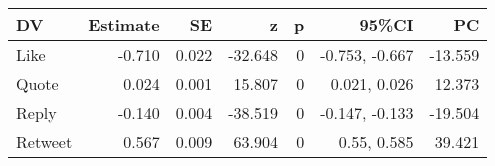 
\begin{tabular}{lrrrrrr}
\toprule
DV & Estimate & SE & z & p & 95\%CI & PC\\
\midrule
Like & -0.710 & 0.022 & -32.648 & 0 & -0.753, -0.667 & -13.559\\
Quote & 0.024 & 0.001 & 15.807 & 0 & 0.021, 0.026 & 12.373\\
Reply & -0.140 & 0.004 & -38.519 & 0 & -0.147, -0.133 & -19.504\\
Retweet & 0.567 & 0.009 & 63.904 & 0 & 0.55, 0.585 & 39.421\\
\bottomrule
\end{tabular}
